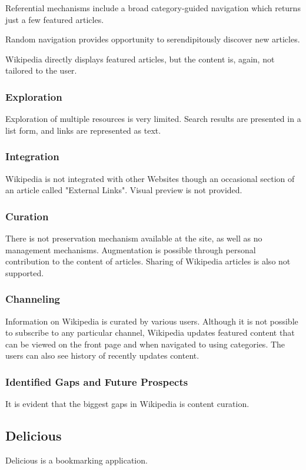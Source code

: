 {{{Referential mechanisms include a broad category-guided navigation which returns just a few featured articles.

Random navigation provides opportunity to serendipitously discover new articles. 

Wikipedia directly displays featured articles, but the content is, again, not tailored to the user. 
}%
{\subsubsection{Exploration}
Exploration of multiple resources is very limited. Search results are presented in a list form, and links are represented as text. 
}%
{\subsubsection{Integration}
Wikipedia is not integrated with other Websites though an occasional section of an article called "External Links". Visual preview is not provided.
}%
{\subsubsection{Curation}
There is not preservation mechanism available at the site, as well as no management mechanisms. Augmentation is possible through personal contribution to the content of articles.  Sharing of Wikipedia articles is also not supported. 

}%
{\subsubsection{Channeling}
Information on Wikipedia is curated by various users. Although it is not possible to subscribe to any particular channel, Wikipedia updates featured content that can be viewed on the front page and when navigated to using categories. The users can also see history of recently updates content. 
}%
{\subsubsection{Identified Gaps and Future Prospects}
It is evident that the biggest gaps in Wikipedia is content curation. 
}%

} %


{\subsection{Delicious}
Delicious is a bookmarking application. 

}}

